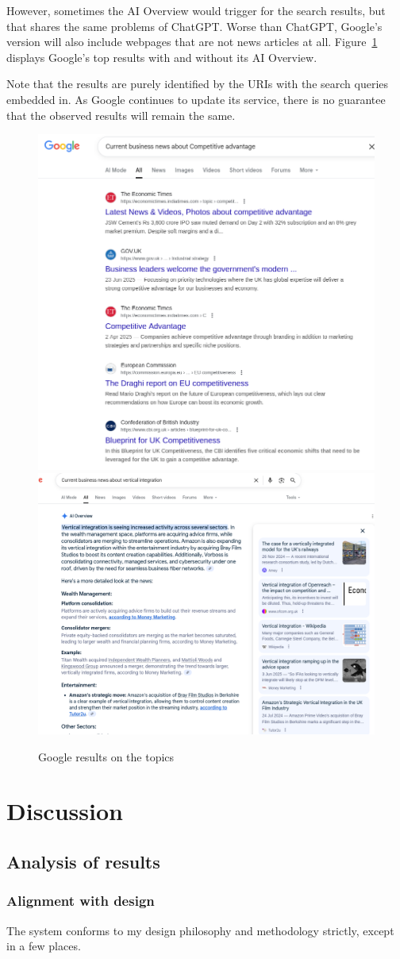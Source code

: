 \documentclass[final-report]{report-template}
\begin{document}
However, sometimes the AI Overview would trigger for the search results, but
that shares the same problems of ChatGPT. Worse than ChatGPT, Google's version
will also include webpages that are not news articles at all.
Figure~\ref{fig.results.google} displays Google's top results with and without
its AI Overview.

Note that the results are purely identified by the URIs with the search queries
embedded in. As Google continues to update its service, there is no guarantee
that the observed results will remain the same.

\begin{figure}[hbtp!]
	\centering
	\includegraphics[width=.3\textwidth]{res/google_res1.png}
	\includegraphics[width=.5\textwidth]{res/google_res2.png}
	\caption{Google results on the topics}
	\label{fig.results.google}
\end{figure}


\section{Discussion}
\subsection{Analysis of results}
\subsubsection{Alignment with design}
The system conforms to my design philosophy and methodology strictly, except
in a few places. 
\end{document}
